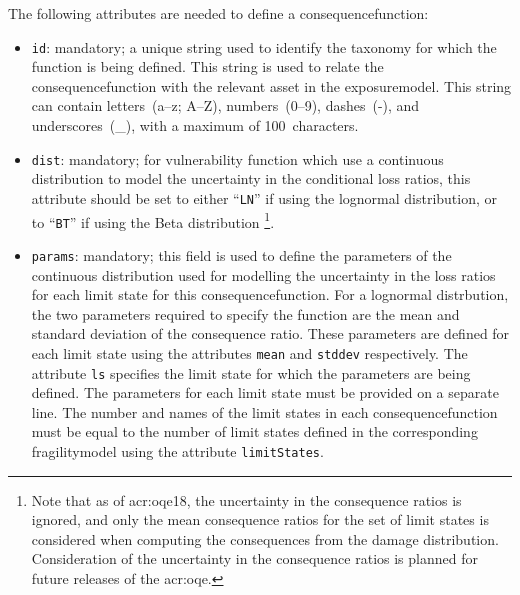 \inputminted[firstline=11,firstnumber=11,lastline=16,fontsize=\footnotesize,frame=single,linenos,bgcolor=lightgray]{xml}{oqum/risk/verbatim/input_consequence.xml}

The following attributes are needed to define a \gls{consequencefunction}:

\begin{itemize}

  \item \Verb+id+: mandatory; a unique string used to identify the 
    \gls{taxonomy} for which the function is being defined. This string is used
    to relate the \gls{consequencefunction} with the relevant \gls{asset} in the 
    \gls{exposuremodel}. This string can contain letters~(a--z; A--Z),
    numbers~(0--9), dashes~(-), and underscores~(\_), with a maximum of
    100~characters.

  \item \Verb+dist+: mandatory; for vulnerability function which use a continuous 
    distribution to model the uncertainty in the conditional loss ratios, 
    this attribute should be set to either ``\Verb+LN+'' if using the lognormal
    distribution, or to ``\Verb+BT+'' if using the Beta distribution
    \footnote{Note that as of \glsdesc{acr:oqe18}, the uncertainty in the 
    consequence ratios is ignored, and only the mean consequence ratios for the
    set of limit states is considered when computing the consequences from the
    damage distribution. Consideration of the uncertainty in the consequence
    ratios is planned for future releases of the \glsdesc{acr:oqe}.}.

  \item \Verb+params+: mandatory; this field is used to define the parameters of 
    the continuous distribution used for modelling the uncertainty in the
    loss ratios for each limit state for this 
    \gls{consequencefunction}. For a lognormal distrbution, 
    the two parameters required to specify the function are the mean and 
    standard deviation of the consequence ratio. These parameters are defined for 
    each limit state using the attributes \Verb+mean+ and \Verb+stddev+ 
    respectively. The attribute \Verb+ls+ specifies the limit state for which 
    the parameters are being defined. The parameters for each limit state
    must be provided on a separate line. The number and names of the limit 
    states in each \gls{consequencefunction} must be equal to the number of limit 
    states defined in the corresponding \gls{fragilitymodel}
    using the attribute \Verb+limitStates+.

\end{itemize}